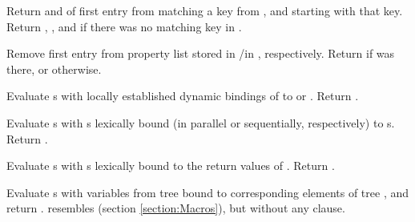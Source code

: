 \begin{LIST}{1cm}
  {
  Return  and  of first entry from 
  matching a key from , and  starting with that key. Return \retval{\NIL},
  \retvalii{\NIL}, and  \retvaliii{\NIL} if there was no matching key
  in .
  }

  {
    Remove first entry  from property list stored in
    /in , respectively. Return \retval{\T} if 
    was there, or \retval{\NIL} otherwise.
  }

  {
    Evaluate s with locally established dynamic bindings of
     to  or \NIL. Return . 
  }

  {
    Evaluate s with s lexically bound (in parallel or
    sequentially, respectively) to s. Return
    . 
  }

  {
    Evaluate s with s lexically bound to the
    return values of . Return .
  }

  {
    Evaluate s with variables from tree
     bound to corresponding elements of tree
    , and return .  resembles 
    (section \ref{section:Macros}), but without any 
    clause. 
  }

\end{LIST}


